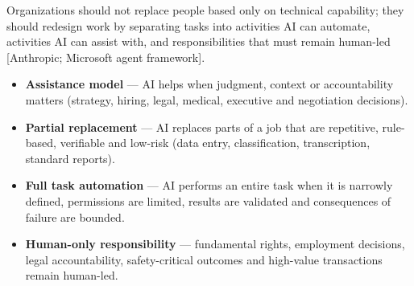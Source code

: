 Organizations should not replace people based only on technical capability;
they should redesign work by separating tasks into activities AI can
automate, activities AI can assist with, and responsibilities that must
remain human-led [Anthropic; Microsoft agent framework].

\begin{itemize}
  \item \textbf{Assistance model} — AI helps when judgment, context or
        accountability matters (strategy, hiring, legal, medical, executive
        and negotiation decisions).
  \item \textbf{Partial replacement} — AI replaces parts of a job that are
        repetitive, rule-based, verifiable and low-risk (data entry,
        classification, transcription, standard reports).
  \item \textbf{Full task automation} — AI performs an entire task when it is
        narrowly defined, permissions are limited, results are validated and
        consequences of failure are bounded.
  \item \textbf{Human-only responsibility} — fundamental rights, employment
        decisions, legal accountability, safety-critical outcomes and
        high-value transactions remain human-led.
\end{itemize}

\begin{center}
\end{center}

